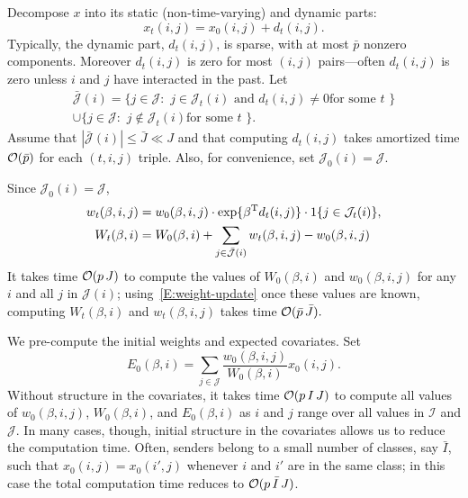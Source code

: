 \documentclass[final]{statsoc}
\begin{document}
Decompose $x$ into its static (non-time-varying) and dynamic parts:
\begin{equation}\label{E:x-static-dynamic}
    x_t(i,j)
        = x_0(i,j) + d_t(i,j).
\end{equation}
Typically, the dynamic part, $d_t(i,j)$, is sparse, with at most $\bar p$
nonzero components.  Moreover $d_t(i,j)$ is zero for most $(i,j)$
pairs---often $d_t(i,j)$ is zero unless $i$ and $j$ have interacted in
the past.  Let
\begin{multline*}
    \mathcal{\bar J}(i)
        =
            \{
                j \in \mathcal{J} :
                \text{
                    $j \in \mathcal{J}_t(i)$ and $d_t(i,j) \neq 0$
                    for some $t$
                }
            \} \\
        \cup
            \{
                j \in \mathcal{J} :
                \text{
                    $j \notin \mathcal{J}_t(i)$
                    for some $t$
                }
            \}.
\end{multline*}
Assume that $|\mathcal{\bar J}(i)| \le \bar J \ll J$ and that
computing $d_t(i,j)$ takes amortized time $\mathcal{O}(\bar p)$ for each
$(t,i,j)$ triple.  Also, for convenience, set 
$\mathcal{J}_0(i) = \mathcal{J}$.

Since $\mathcal{J}_0(i) = \mathcal{J}$,
\begin{subequations}\label{E:weight-update}
\begin{align}
    w_{t}(\beta,i,j)
        &=
            w_{0}(\beta,i,j)
            \cdot
            \exp\{ \beta^{\mathrm{T}} d_t(i,j) \}
            \cdot
            1\{j \in \mathcal{J}_t(i)\},
    \label{E:weight-update-pair}
    \\
    W_{t}(\beta,i)
        &=
            W_{0}(\beta,i)
            +
            \sum_{j \in \mathcal{\bar J}(i)}
                w_{t}(\beta,i,j) - w_{0}(\beta,i,j)
    \label{E:weight-sum-update}
\end{align}
\end{subequations}
It takes time $\mathcal{O}(p \, J)$ to compute the values of
$W_{0}(\beta,i)$ and $w_{0}(\beta,i,j)$ for any $i$ and all
$j$ in $\mathcal{J}(i)$; using~\eqref{E:weight-update} once these values are
known, computing  $W_{t}(\beta,i)$ and $w_{t}(\beta,i,j)$ takes time
\(
    \mathcal{O}(\bar p \, \bar J).
\)

We pre-compute the initial weights and expected covariates.  Set
\[
    E_0(\beta, i)
        =
        \sum_{j \in \mathcal{J}}
            \frac{w_{0}(\beta, i,j)}{W_{0}(\beta, i)}
            x_0(i,j).
\]
Without structure in the covariates, it takes time
$\mathcal{O}(p \, I \, J)$ to compute all values of $w_0(\beta, i,j)$,
$W_0(\beta, i)$, and $E_0(\beta, i)$
as $i$ and $j$ range over all values in $\mathcal{I}$ and $\mathcal{J}$.
In many cases, though, initial structure in the covariates allows us
to reduce the computation time.  Often, senders belong to a small number of
classes, say $\bar I$, such that $x_{0}(i,j) = x_{0}(i',j)$ whenever $i$ and
$i'$ are in the same class; in this case the total computation time
reduces to $\mathcal{O}(p \, \bar I \, J)$.
\end{document}

